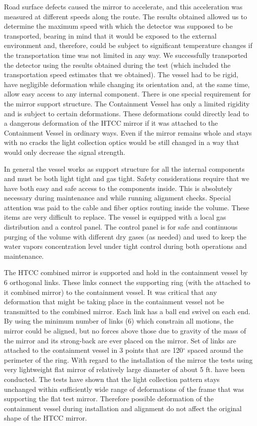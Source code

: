   Road surface defects caused the mirror to accelerate, and this acceleration was measured at different speeds along the route. The results obtained allowed us to determine the maximum speed with which the detector was supposed to be transported, bearing in mind that it would be exposed to the external environment and, therefore, could be subject to significant temperature changes if the transportation time was not limited in any way. We successfully transported the detector using the results obtained during the test (which included the transportation speed estimates that we obtained). The vessel had to be rigid, have negligible deformation while changing its orientation and, at the same time, allow easy access to any internal component. There is one special requirement for the mirror support structure. The Containment Vessel has only a limited rigidity and is subject to certain deformations. These deformations could directly lead to a dangerous deformation of the HTCC mirror if it was attached to the Containment Vessel in ordinary ways. Even if the mirror remains whole and stays with no cracks the light collection optics would be still changed in a way that would only decrease the signal strength.

\indent In general the vessel works as support structure for all the internal components and must be both light tight and gas tight. Safety considerations require that we have both easy and safe access to the components inside. This is absolutely necessary during maintenance and while running alignment checks. Special attention was paid to the cable and fiber optics routing inside the volume. These items are very difficult to replace. The vessel is equipped with a local gas distribution and a control panel. The control panel is for safe and continuous purging of the volume with different dry gases (as needed) and used to keep the water vapors concentration level under tight control during both  operations and maintenance.

\indent The HTCC combined mirror is supported and hold in the containment vessel by 6 orthogonal links. These links connect the supporting ring (with the attached to it combined mirror) to the containment vessel.
\indent It was critical that any deformation that might be taking place in the containment vessel not be transmitted to the combined mirror. Each link has a ball end swivel on each end. By using the minimum number of links (6) which constrain all motions, the mirror could be aligned, but no forces above those due to gravity of the mass of the mirror and its strong-back are ever placed on the mirror. Set of links are attached to the containment vessel in 3 points that are 120$^\circ$ spaced around the perimeter of the ring. With regard to the installation of the mirror the tests using very lightweight flat mirror of relatively large diameter of about 5 ft. have been conducted. The tests have shown that the light collection pattern stays unchanged within sufficiently wide range of deformations of the frame that was supporting the flat test mirror. Therefore possible deformation of the containment vessel during installation and alignment do not affect the original shape of the HTCC mirror. 

